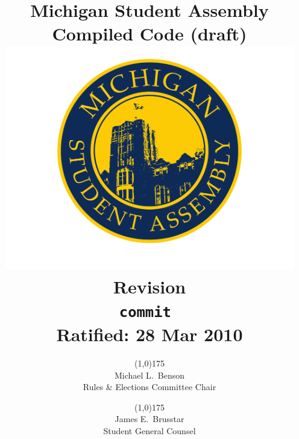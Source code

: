 \documentclass{code}
\begin{document}
	\renewcommand{\thepage}{\roman{page}}
	\title{Michigan Student Assembly Compiled Code (draft) \\
			\large \includegraphics[width=5in]{2008_msa_color_logo} \\
			Revision  \\
			{\tt commit \GITAbrHash} \\
			Ratified: 28 Mar 2010}
	\author{\line(1,0){175} \\
			Michael L.~Benson \\
			Rules \& Elections Committee Chair
				\and
			\line(1,0){175} \\
			James E.~Brusstar \\
			Student General Counsel}
	\date{}
	\maketitle
	\tableofcontents
	\newpage

	\renewcommand{\thepage}{\arabic{page}}
	\setcounter{page}{1}
	\pagestyle{fancy}
	\headheight 35pt
	\thispagestyle{empty}
	\linenumbers

	
	
	
	
	
	
	
	
	
	
	
	
	
\end{document}
